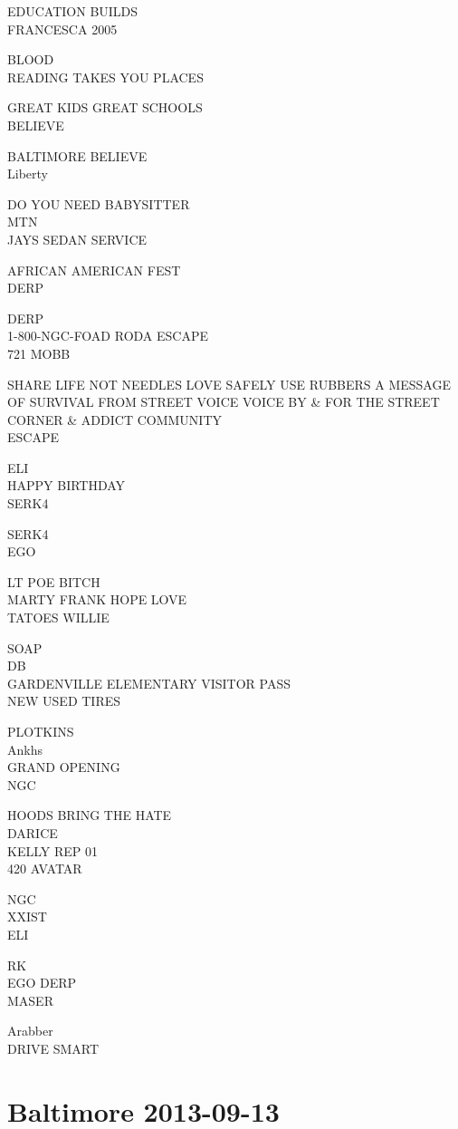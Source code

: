 \documentclass[10pt,letterpaper]{article}
\begin{document}
EDUCATION BUILDS\\
FRANCESCA 2005

BLOOD\\
READING TAKES YOU PLACES

GREAT KIDS GREAT SCHOOLS\\
BELIEVE

BALTIMORE BELIEVE\\
Liberty

DO YOU NEED BABYSITTER\\
MTN\\
JAYS SEDAN SERVICE

AFRICAN AMERICAN FEST\\
DERP

DERP\\
1{-}800{-}NGC{-}FOAD RODA ESCAPE\\
721 MOBB

SHARE LIFE NOT NEEDLES LOVE SAFELY USE RUBBERS A MESSAGE OF SURVIVAL FROM STREET VOICE VOICE BY \& FOR THE STREET CORNER \& ADDICT COMMUNITY\\
ESCAPE

ELI\\
HAPPY BIRTHDAY\\
SERK4

SERK4\\
EGO

LT POE BITCH\\
MARTY FRANK HOPE LOVE\\
TATOES WILLIE

SOAP\\
DB\\
GARDENVILLE ELEMENTARY VISITOR PASS\\
NEW USED TIRES

PLOTKINS\\
Ankhs\\
GRAND OPENING\\
NGC

HOODS BRING THE HATE\\
DARICE\\
KELLY REP 01\\
420 AVATAR

NGC\\
XXIST\\
ELI

RK\\
EGO DERP\\
MASER

Arabber\\
DRIVE SMART
\

\section*{Baltimore 2013-09-13}
\end{document}
